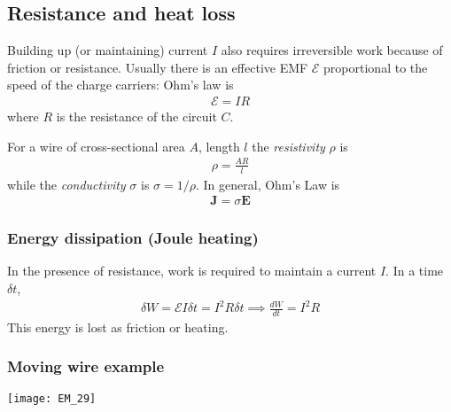 \documentclass[a4paper]{article}
\begin{document}
\subsection{Resistance and heat loss}
Building up (or maintaining) current $I$ also requires irreversible work because of friction or resistance. Usually there is an effective EMF $\mathcal{E}$ proportional to the speed of the charge carriers: Ohm's law is
\begin{equation*}\tag{4.14} \label{eq:4.14}
\begin{aligned}
\mathcal{E}=IR
\end{aligned}
\end{equation*}
where $R$ is the resistance of the circuit $C$.

For a wire of cross-sectional area $A$, length $l$ the \emph{resistivity} $\rho$ is
\begin{equation*}\tag{4.15} \label{eq:4.15}
\begin{aligned}
\rho = \frac{AR}{l}
\end{aligned}
\end{equation*}
while the \emph{conductivity} $\sigma$ is $\sigma = 1/\rho$. In general, Ohm's Law is 
\begin{equation*}\tag{4.16} \label{eq:4.16}
\begin{aligned}
\mathbf{J} = \sigma \mathbf{E}
\end{aligned}
\end{equation*}

\subsubsection{Energy dissipation (Joule heating)}
In the presence of resistance, work is required to maintain a current $I$. In a time $\delta t$,
\begin{equation*}\tag{4.17} \label{eq:4.17}
\begin{aligned}
\delta W = \mathcal{E} I \delta t = I^2 R \delta t \implies \frac{dW}{dt} = I^2 R
\end{aligned}
\end{equation*}
This energy is lost as friction or heating.

\subsubsection{Moving wire example}

\texttt{[image: EM\_29]}
\end{document}
